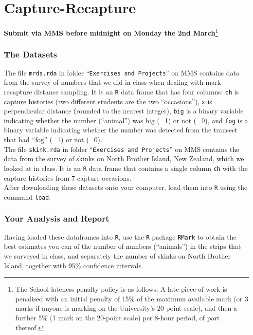 \chapter{Capture-Recapture\label{ch:cr_proj}}



\begin{center}
\textbf{Submit via MMS before midnight on Monday the 2nd March}\footnote{The School lateness penalty policy is as follows: A late piece of work is penalised with an initial penalty of 15\% of the maximum available mark (or 3 marks if anyone is marking on the University's 20-point scale), and then a further 5\% (1 mark on the 20-point scale) per 8-hour period, of part thereof.}
\end{center}

\subsection*{The Datasets}

The file \verb|mrds.rda| in folder ``\verb|Exercises and Projects|'' on MMS contains data from the survey of numbers that we did in class when dealing with mark-recapture distance sampling. It is an \verb|R| data frame that has four columns: \verb|ch| is capture histories (two different students are the two ``occasions''), \verb|x| is perpendicular distance (rounded to the nearest integer), \verb|big| is a binary variable indicating whether the number (``animal'') was big (=1) or not (=0), and \verb|fog| is a binary variable indicating whether the number was detected from the transect that had ``fog'' (=1) or not (=0). \\

The file \verb|skink.rda| in folder ``\verb|Exercises and Projects|'' on MMS contains the data from the survey of skinks on North Brother Island, New Zealand, which we looked at in class. It is an \verb|R| data frame that contains a single column \verb|ch| with the capture histories from 7 capture occasions. \\

After downloading these datasets onto your computer, load them into \verb|R| using the command \verb|load|. 


\subsection*{Your Analysis and Report}

Having loaded these dataframes into \verb|R|, use the \verb|R| package \verb|RMark| to obtain the best estimates you can of the number of numbers (``animals'') in the strips that we surveyed in class, and separately the number of skinks on North Brother Island, together with 95\% confidence intervals. \\

